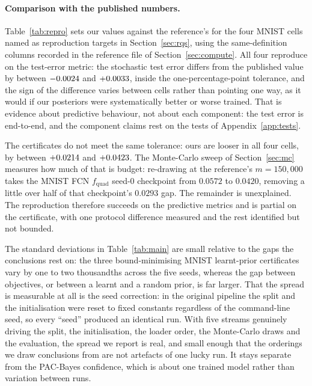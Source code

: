 \paragraph{Comparison with the published numbers.} Table~\ref{tab:repro} sets our
values against the reference's for the four MNIST cells named as reproduction
targets in Section~\ref{sec:rqs}, using the same-definition columns recorded in
the reference file of Section~\ref{sec:compute}. All four reproduce on the
test-error metric: the stochastic test error differs from the published value by
between $-0.0024$ and $+0.0033$, inside the
one-percentage-point tolerance, and
the sign of the difference varies between cells rather than pointing one way, as
it would if our posteriors were systematically better or worse trained. That is
evidence about predictive behaviour, not about each component: the test error is
end-to-end, and the component claims rest on the tests of
Appendix~\ref{app:tests}.

\begin{table}[h]\centering\small
\caption{Reproduction of the four MNIST cells named in Section~\ref{sec:rqs},
against the published values of \textcite{perezortiz2021}. Ours are means over
five seeds. The published numbers were obtained with $m=150{,}000$ Monte-Carlo
samples and a per-cell grid search; ours with $m=2{,}000$ and one fixed
configuration.}\label{tab:repro}

\end{table}

The certificates do not meet the same tolerance: ours are looser in all four
cells, by between $+0.0214$ and $+0.0423$. The Monte-Carlo sweep of
Section~\ref{sec:mc} measures how much of that is budget: re-drawing at the
reference's $m=150{,}000$ takes the MNIST FCN $f_{\text{quad}}$ seed-0 checkpoint
from $0.0572$ to $0.0420$, removing a little over half of that checkpoint's
$0.0293$ gap. The remainder is unexplained. The reproduction therefore succeeds on the
predictive metrics and is partial on the certificate, with one protocol difference
measured and the rest identified but not bounded.

The standard deviations in Table~\ref{tab:main} are small relative to the gaps the
conclusions rest on: the three bound-minimising MNIST learnt-prior certificates
vary by one to two thousandths across the five seeds, whereas the gap between
objectives, or between a learnt and a random prior, is far larger. That the
spread is measurable at all is the seed correction: in the original pipeline the
split and the initialisation were reset to fixed constants regardless of the
command-line seed, so every ``seed'' produced an identical run. With five streams
genuinely driving the split, the initialisation, the loader order, the
Monte-Carlo draws and the evaluation, the spread we report is real, and small
enough that the orderings we draw conclusions from are not artefacts of one lucky
run. It stays separate from the PAC-Bayes confidence, which is about one trained
model rather than variation between runs.

